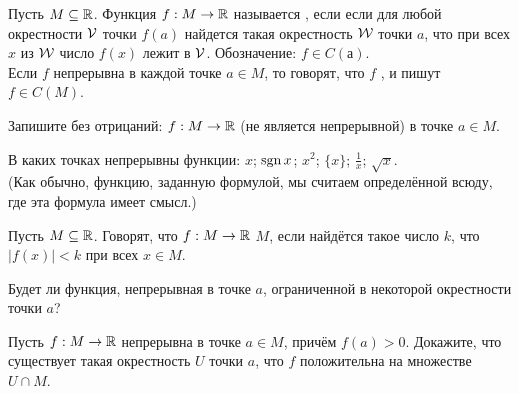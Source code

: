 \documentclass[a4paper,12pt]{article}
\begin{document}




Пусть $M \subseteq\mathbb{R}$. Функция $f:M\rightarrow\mathbb{R}$
называется , если
если для любой окрестности ${\cal V}$ точки $f(a)$
найдется такая окрестность ${\cal W}$ точки $a$, что при всех $x$ из $\cal W$
число $f(x)$ лежит в $\cal V$. Обозначение: $f\in C(а)$.\\
Если $f$ непрерывна в каждой точке $a\in M$, то говорят, что $f$ , и пишут
\hbox{$f\in C(M)$.}

 Запишите без отрицаний:  $f:M \rightarrow \mathbb{R}$
 (не является непрерывной) в точке $a\in M$.

 В каких точках непрерывны %
функции:
   $x$;
   $\mathop{\mbox{\rm sgn}}x$;
   $x^2$;
   $\{x\}$;
   $\frac 1x$;
   $\sqrt x$.\\
{\small (Как обычно, функцию, заданную формулой, мы считаем определ\"енной
всюду, где эта формула имеет смысл.)}


Пусть $M\subseteq\mathbb{R}$.
Говорят, что $f:M\rightarrow\mathbb{R}$ 
$M$, если найд\"ется такое число $k$, что $|f(x)|<k$ при всех $x\in M$.

 Будет ли функция, непрерывная в точке $a$, ограниченной
в некоторой окрестности точки $a$?

 Пусть $f:M \rightarrow \mathbb{R}$ непрерывна в точке $a\in M$, прич\"ем $f(a) > 0$.
Докажите, что существует такая окрестность $U$ точки $a$, что $f$
положительна на множестве $U \cap M$.
\end{document}
